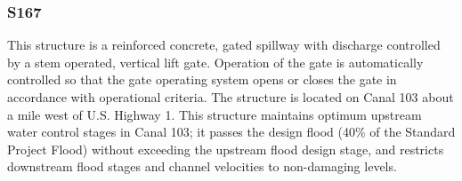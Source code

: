 
%
%



\clearpage
\subsubsection{S167}

This structure is a reinforced concrete, gated spillway with discharge controlled by a stem operated, vertical lift gate. Operation of the gate is automatically controlled so that the gate operating system opens or closes the gate in accordance with operational criteria. The structure is located on Canal 103 about a mile west of U.S. Highway 1. This structure maintains optimum upstream water control stages in Canal 103; it passes the design flood (40\% of the Standard Project Flood) without exceeding the upstream flood design stage, and restricts downstream flood stages and channel velocities to non-damaging levels.

